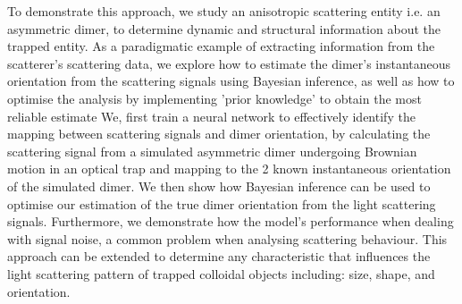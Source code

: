 \documentclass[12pt]{spieman}
\begin{document}
\begin{spacing}{1.5}
To demonstrate this approach, we study an anisotropic scattering entity i.e. an asymmetric dimer, to determine dynamic and structural information about the trapped entity. As a paradigmatic example of extracting information from the scatterer’s scattering data, we explore how to estimate the dimer's instantaneous orientation from the scattering signals using Bayesian inference, as well as how to optimise the analysis by implementing 'prior knowledge' to obtain the most reliable estimate We, first train a neural network to effectively identify the mapping between scattering signals and dimer orientation, by calculating the scattering signal from a simulated asymmetric dimer undergoing Brownian motion in an optical trap and mapping to the 2 known instantaneous orientation of the simulated dimer. We then show how Bayesian inference can be used to optimise our estimation of the true dimer orientation from the light scattering signals. Furthermore, we demonstrate how the model's performance when dealing with signal noise, a common problem when analysing scattering behaviour. This approach can be extended to determine any characteristic that influences the light scattering pattern of trapped colloidal objects including: size, shape, and orientation. 


\end{spacing}
\end{document}
